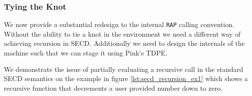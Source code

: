 \documentclass[a4paper,12pt,twoside,openright]{report}
\theoremstyle{definition}
\newcommand{\mslang}{$\lambda_{\uparrow\downarrow}$}
\begin{document}




\subsubsection{Tying the Knot}\label{ssubsec:knot}
We now provide a substantial redesign to the internal \texttt{RAP} calling convention. Without the ability to tie a knot in the environment we need a different way of achieving recursion in SECD. Additionally we need to design the internals of the machine such that we can stage it using Pink's TDPE.

We demonstrate the issue of partially evaluating a recursive call in the standard SECD semantics on the example in figure \ref{lst:secd_recursion_ex1} which shows a recursive function that decrements a user provided number down to zero.
\end{document}
